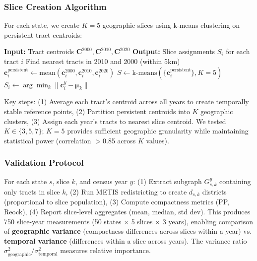 \subsubsection{Slice Creation Algorithm}

For each state, we create $K=5$ geographic slices using k-means clustering on persistent tract centroids:

\begin{algorithm}[H]
\caption{Slice Creation}
\begin{algorithmic}[1]
\State \textbf{Input:} Tract centroids $\mathbf{C}^{2000}, \mathbf{C}^{2010}, \mathbf{C}^{2020}$
\State \textbf{Output:} Slice assignments $S_i$ for each tract $i$
\State
{}
    \State Find nearest tracts in 2010 and 2000 (within 5km)
    \State $\mathbf{c}_i^{\text{persistent}} \gets \text{mean}(\mathbf{c}_i^{2000}, \mathbf{c}_i^{2010}, \mathbf{c}_i^{2020})$
\EndFor
\State $S \gets \text{k-means}(\{\mathbf{c}_i^{\text{persistent}}\}, K=5)$
        \State $S_i \gets \arg\min_k \|\mathbf{c}_i^y - \boldsymbol{\mu}_k\|$
    \EndFor
\EndFor
\end{algorithmic}
\end{algorithm}

Key steps: (1) Average each tract's centroid across all years to create temporally stable reference points, (2) Partition persistent centroids into $K$ geographic clusters, (3) Assign each year's tracts to nearest slice centroid. We tested $K \in \{3, 5, 7\}$; $K=5$ provides sufficient geographic granularity while maintaining statistical power (correlation $>$0.85 across $K$ values).

\subsubsection{Validation Protocol}

For each state $s$, slice $k$, and census year $y$: (1) Extract subgraph $G_{s,k}^y$ containing only tracts in slice $k$, (2) Run METIS redistricting to create $d_{s,k}$ districts (proportional to slice population), (3) Compute compactness metrics (PP, Reock), (4) Report slice-level aggregates (mean, median, std dev). This produces 750 slice-year measurements (50 states × 5 slices × 3 years), enabling comparison of \textbf{geographic variance} (compactness differences across slices within a year) vs. \textbf{temporal variance} (differences within a slice across years). The variance ratio $\sigma^2_{\text{geographic}} / \sigma^2_{\text{temporal}}$ measures relative importance.

